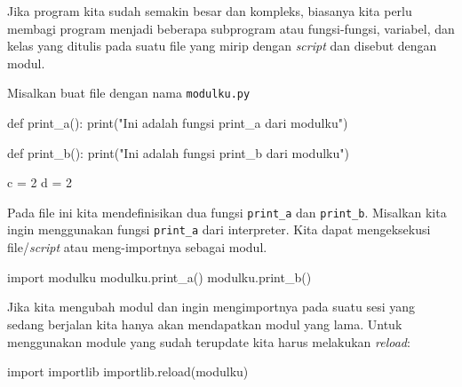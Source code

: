 Jika program kita sudah semakin besar dan kompleks, biasanya kita perlu membagi program
menjadi beberapa subprogram atau fungsi-fungsi, variabel, dan kelas
yang ditulis pada suatu file yang mirip
dengan \textit{script} dan disebut dengan modul.

Misalkan buat file dengan nama \texttt{modulku.py}
\begin{pythoncode}
def print_a():
    print("Ini adalah fungsi print_a dari modulku")

def print_b():
    print("Ini adalah fungsi print_b dari modulku")

c = 2
d = 2
\end{pythoncode}

Pada file ini kita mendefinisikan dua fungsi \verb|print_a| dan \verb|print_b|.
Misalkan kita ingin menggunakan fungsi \verb|print_a| dari interpreter.
Kita dapat mengeksekusi file/\textit{script} atau meng-importnya sebagai
modul.

\begin{pythoncode}
import modulku
modulku.print_a()
modulku.print_b()
\end{pythoncode}

Jika kita mengubah modul dan ingin mengimportnya pada suatu sesi yang sedang berjalan
kita hanya akan mendapatkan modul yang lama.
Untuk menggunakan module yang sudah terupdate kita harus melakukan \textit{reload}:
\begin{pythoncode}
import importlib
importlib.reload(modulku)
\end{pythoncode}

